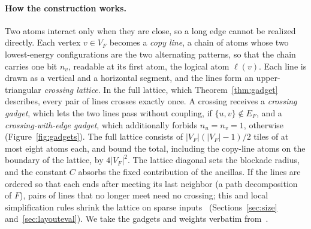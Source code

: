\documentclass[a4paper,fleqn]{cas-sc}
\begin{document}
\paragraph{How the construction works.} Two atoms interact only when they are close,
so a long edge cannot be realized directly. Each vertex $v\in V_F$ becomes a
\emph{copy line}, a chain of atoms whose two lowest-energy configurations are the two
alternating patterns, so that the chain carries one bit $n_v$, readable at its first
atom, the logical atom $\ell(v)$. Each line is drawn as a vertical and a horizontal
segment, and the lines form an upper-triangular \emph{crossing lattice}. In the full
lattice, which Theorem~\ref{thm:gadget} describes, every pair of lines crosses exactly
once. A crossing receives a \emph{crossing gadget}, which lets the two lines pass
without coupling, if $\{u,v\}\notin E_F$, and a \emph{crossing-with-edge gadget},
which additionally forbids $n_u=n_v=1$, otherwise (Figure~\ref{fig:gadgets}). The
full lattice consists of $|V_F|(|V_F|-1)/2$ tiles of at most eight atoms each, and
\citet[Sec.~V\,A]{Nguyen2023} bound the total, including the copy-line atoms on the
boundary of the lattice, by $4|V_F|^2$. The lattice diagonal sets the blockade
radius, and the constant $C$ absorbs the fixed contribution of the ancillas. If the
lines are ordered so that each ends after meeting its last neighbor (a path
decomposition of $F$), pairs of lines that no longer meet need no crossing; this and
local simplification rules shrink the lattice on sparse
inputs~\cite[App.~A]{Nguyen2023}
(Sections~\ref{sec:size} and~\ref{sec:layouteval}). We take the gadgets and weights
verbatim from~\cite{Nguyen2023}.
\end{document}
